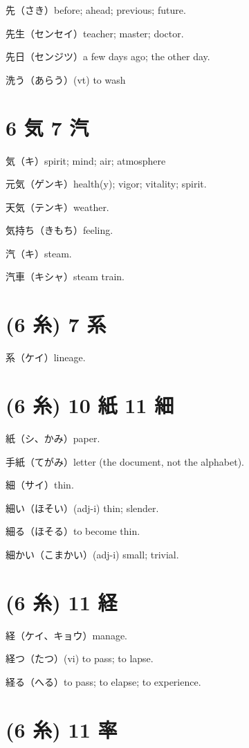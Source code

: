 先（さき）before; ahead; previous; future.

先生（センセイ）teacher; master; doctor.

先日（センジツ）a few days ago; the other day.

洗う（あらう）(vt) to wash

\section{6 気 7 汽}

気（キ）spirit; mind; air; atmosphere

元気（ゲンキ）health(y); vigor; vitality; spirit.

天気（テンキ）weather.

気持ち（きもち）feeling.

汽（キ）steam.

汽車（キシャ）steam train.

\section{(6 糸) 7 系}

系（ケイ）lineage.

\section{(6 糸) 10 紙 11 細}

紙（シ、かみ）paper.

手紙（てがみ）letter (the document, not the alphabet).

細（サイ）thin.

細い（ほそい）(adj-i) thin; slender.

細る（ほそる）to become thin.

細かい（こまかい）(adj-i) small; trivial.

\section{(6 糸) 11 経}

経（ケイ、キョウ）manage.

経つ（たつ）(vi) to pass; to lapse.

経る（へる）to pass; to elapse; to experience.

\section{(6 糸) 11 率}

